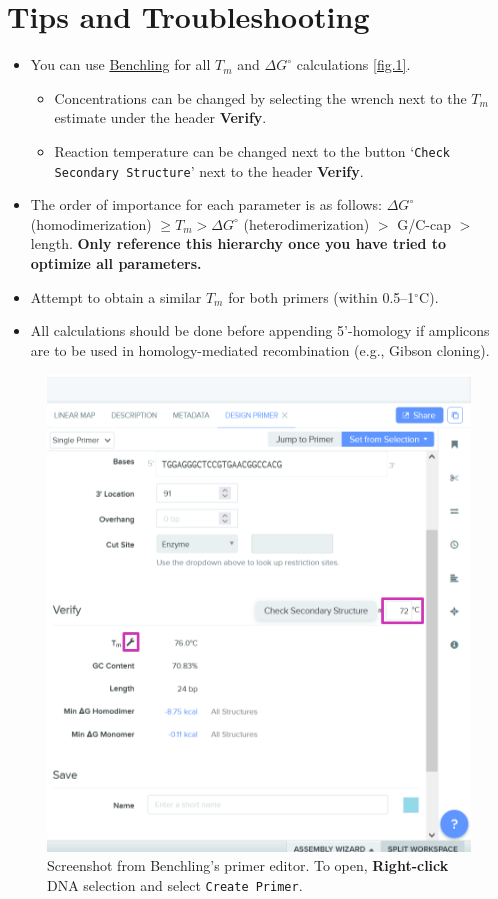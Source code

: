 \documentclass[twocolumn]{article}
\begin{document}
\section{Tips and Troubleshooting}
\begin{itemize}
	\item You can use \href{https://benchling.com/editor}{Benchling} for all $T_m$ and $\Delta G^\circ$ calculations \autoref{fig.1}.
	\begin{itemize}
			\item Concentrations can be changed by selecting the wrench next to the $T_m$ estimate under the header \textbf{Verify}.
			\item Reaction temperature can be changed next to the button `\texttt{Check Secondary Structure}' next to the header \textbf{Verify}.
	\end{itemize}
	\item The order of importance for each parameter is as follows:  $\Delta G^\circ$ (homodimerization) $\ge T_m > \Delta G^\circ$ (heterodimerization) $>$ G/C-cap $>$ length. \textbf{Only reference this hierarchy once you have tried to optimize all parameters.}
	\item Attempt to obtain a similar $T_m$ for both primers (within 0.5--1$^\circ$C).
	\item All calculations should be done before appending 5'-homology if amplicons are to be used in homology-mediated recombination (e.g., Gibson cloning).
\end{itemize}

\begin{figure}[h]
	\includegraphics[width=\linewidth]{figure.png}
	\caption{Screenshot from Benchling's primer editor. To open, \textbf{Right-click} DNA selection and select \texttt{Create Primer}.}
	\label{fig.1}
\end{figure}

%
%
\end{document}
